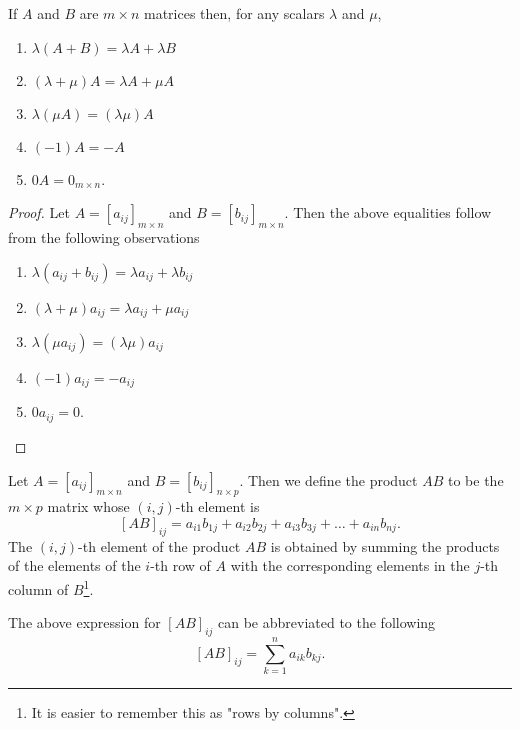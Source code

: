\documentclass[10pt, a4paper]{article}
\begin{document}
\begin{theorem}
    If $A$ and $B$ are $m\times n$ matrices then, for any scalars $\lambda$ and $\mu$,
    \begin{enumerate}[label = (\arabic*)]
        \item $\lambda (A + B) = \lambda A + \lambda B$
        \item $(\lambda  + \mu)A = \lambda A + \mu A$
        \item $\lambda (\mu A) = (\lambda \mu) A$
        \item $(-1)A = -A$
        \item $0A = 0_{m\times n}$.
    \end{enumerate}
    \begin{proof}
        Let $A = [a_{ij}]_{m\times n}$ and $B = [b_{ij}]_{m\times n}$. Then the above equalities follow from the following observations
        \begin{enumerate}[label = (\arabic*)]
            \item $\lambda (a_{ij} + b_{ij}) = \lambda a_{ij} + \lambda b_{ij}$
            \item $(\lambda  + \mu)a_{ij} = \lambda a_{ij} + \mu a_{ij}$
            \item $\lambda (\mu a_{ij}) = (\lambda \mu) a_{ij}$
            \item $(-1)a_{ij} = -a_{ij}$
            \item $0a_{ij} = 0$.
        \end{enumerate}
    \end{proof}
\end{theorem}

\begin{definition}
    Let $A = [a_{ij}]_{m\times n}$ and $B = [b_{ij}]_{n\times p}$. Then we define the product $AB$ to be the $m\times p$ matrix whose $(i, j)$-th element is
    \[
    [AB]_{ij} = a_{i1}b_{1j} +a_{i2}b_{2j} + a_{i3}b_{3j} + \dotsc + a_{in}b_{nj}.
    \]
    The $(i, j)$-th element of the product $AB$ is obtained by summing the products of the elements of the $i$-th row of $A$ with the corresponding elements in the $j$-th column of $B$\footnote{It is easier to remember this as "rows by columns".}.
\end{definition}
The above expression for $[AB]_{ij}$ can be abbreviated to the following
\[
[AB]_{ij} = \sum_{k = 1}^{n}{a_{ik}b_{kj}}.
\]
\end{document}
